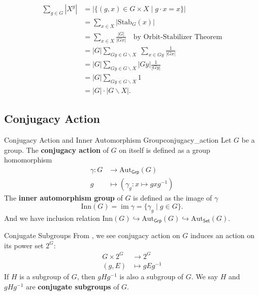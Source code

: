 \begin{prf}
    \begin{align*}
        \sum_{g \in G}\left|X^g\right| & =|\{(g, x) \in G \times X \mid g \cdot x=x\}|                                        \\
                                       & =\sum_{x \in X}\left|\mathrm{Stab}_G(x)\right|                                       \\
                                       & =\sum_{x \in X}\frac{|G|}{\left|G x\right|} \quad \text{by Orbit-Stabilizer Theorem} \\
                                       & =|G| \sum_{G y \in G \backslash X}\; \sum_{x \in Gy}\frac{1}{\left|G x\right|}       \\
                                       & =|G| \sum_{G y \in G \backslash X} \left|Gy\right|\frac{1}{\left|G y\right|}         \\
                                       & =|G| \sum_{G y \in G \backslash X} 1                                                 \\
                                       & =|G| \cdot|G \backslash X|.
    \end{align*}

\end{prf}



\subsection{Conjugacy Action}
\begin{definition}{Conjugacy Action and Inner Automorphism Group}{conjugacy_action}
    Let $G$ be a group. The \textbf{conjugacy action} of $G$ on itself is defined as a group homomorphism
    \begin{align*}
        \gamma:G & \longrightarrow \mathrm{Aut}_{\mathsf{Grp}}(G) \\
        g        & \longmapsto (\gamma_g: x\longmapsto gxg^{-1})
    \end{align*}
    The \textbf{inner automorphism group} of $G$ is defined as the image of $\gamma$
    $$
        \mathrm{Inn}(G)=\operatorname{im}\gamma=\{ \gamma_g\mid g\in G\}.
    $$
    And we have inclusion relation $\mathrm{Inn}(G)\hookrightarrow\mathrm{Aut}_{\mathsf{Grp}}(G)\hookrightarrow\mathrm{Aut}_{\mathsf{Set}}(G)$.
\end{definition}

\begin{definition}{Conjugate Subgroups}{}
    From , we see conjugacy action on $G$ induces an action on its power set $2^G$: \begin{align*}
        G\times 2^G & \longrightarrow 2^G  \\
        (g,E)       & \longmapsto gEg^{-1}
    \end{align*}
    If $H$ is a subgroup of $G$, then $gHg^{-1}$ is also a subgroup of $G$. We say $H$ and $gHg^{-1}$ are \textbf{conjugate subgroups} of $G$.
\end{definition}

